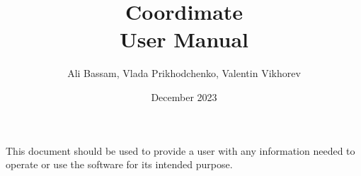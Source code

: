 \documentclass{article}
\title{Coordimate\\User Manual}
\date{December 2023}
\author{Ali Bassam, Vlada Prikhodchenko, Valentin Vikhorev}
\begin{document}
\maketitle

This document should be used to provide a user with any information needed to
operate or use the software for its intended purpose.
\end{document}
